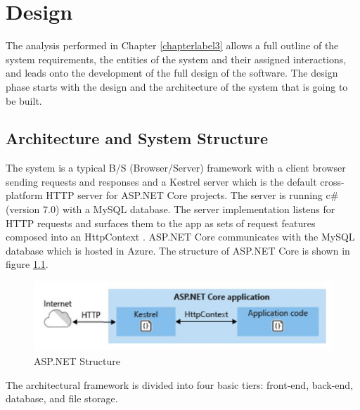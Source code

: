 \chapter{Design}
\label{chapterlabel4}

The analysis performed in Chapter \ref{chapterlabel3} allows a full outline of the system requirements, the entities of the system and their assigned interactions, and leads onto the development of the full design of the software. The design phase starts with the design and the architecture of the system that is going to be built.




\section{Architecture and System Structure}
\label{sub:Architecture_And_System_Structure}

The system is a typical B/S (Browser/Server) framework with a client browser sending requests and responses and a Kestrel server which is the default cross-platform HTTP server for ASP.NET Core projects. The server is running c\# (version 7.0) with a MySQL database. The server implementation listens for HTTP requests and surfaces them to the app as sets of request features composed into an HttpContext \cite{aspNetStructure}. ASP.NET Core communicates with the MySQL database which is hosted in Azure. The structure of ASP.NET Core is shown in figure \ref{asp_structure}.



\begin{figure}[h]
\begin{center}
\includegraphics[width=17cm]{imgs/asp_structure.jpg}
\end{center}\vspace{-0.3cm}
\caption[ASP.NET Structure]{ASP.NET Structure} \label{asp_structure}
\end{figure}


The architectural framework is divided into four basic tiers: front-end, back-end, database, and file storage.

